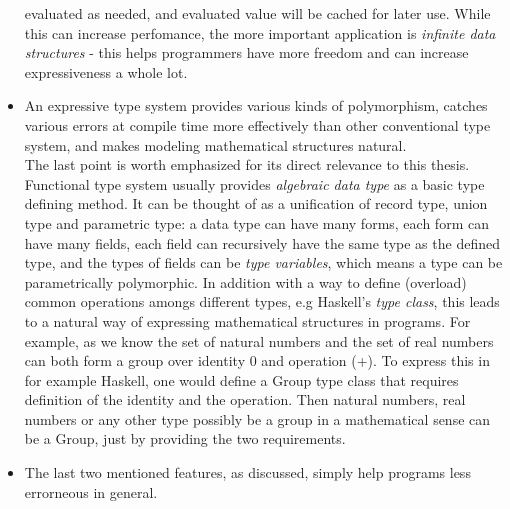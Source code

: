 \documentclass[../gr-final.tex]{subfiles}
\begin{document}
\begin{itemize}
                evaluated as needed, and evaluated value will
                be cached for later use. While this can increase
                perfomance, the more important application is {\it
                infinite data structures} - this helps
                programmers have more freedom and can increase
                expressiveness a whole lot.              
       \item An expressive type system provides various kinds of
               polymorphism, catches various errors at compile
               time more effectively than other conventional type
               system, and makes modeling mathematical structures
               natural.\\
               The last point is worth emphasized for its
               direct relevance to this thesis. Functional type
               system usually provides {\it algebraic data type}
               as a basic type defining method. It can be thought
               of as a unification of record type, union type and
               parametric type: a data type can have many forms,
               each form can have many fields, each field can
               recursively have the same type as the defined
               type, and the types of fields can be {\it type
               variables}, which means a type can be
               parametrically polymorphic. In addition with a way
               to define (overload) common operations amongs
               different types, e.g Haskell's {\it type class}, this
               leads to a natural way of expressing mathematical
               structures in programs.  For example, as we know
               the set of natural numbers and the set of real
               numbers can both form a group over identity 0 and
               operation (+). To express this in for example
               Haskell, one would define a Group type class that
               requires definition of the identity and the
               operation. Then natural numbers, real numbers or
               any other type possibly be a group in a
               mathematical sense can be a Group, just by
               providing the two requirements.
       \item The last two mentioned features, as discussed,
               simply help programs less errorneous in general.        
\end{itemize}                
\end{document}
